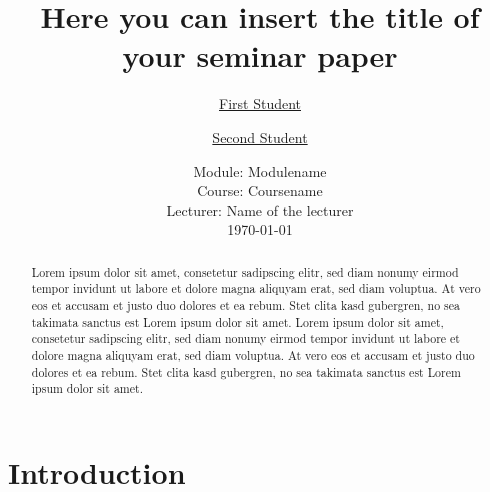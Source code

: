 \documentclass[a4paper]{article}
\begin{document}
	\title{
	\vspace{1cm}
	\Huge Here you can insert the title of \\ your seminar paper \\
	}
	
	\vspace{1cm}
	
	
	\author{\Large \href{mailto:first.student@smail.fh-koeln.de}{First Student} \and \Large \href{mailto:second.student@smail.fh-koeln.de}{Second Student}
	\vspace{1cm}}
	
	\date{
	\large Module: Modulename \\ Course: Coursename \\ 
	\vspace{0.8cm}
	\large Lecturer: Name of the lecturer \\
	\vspace{1cm}
	\today
	}

	\maketitle
	\setlength{\parindent}{0pt}

\vspace{2cm}
\begin{abstract}
Lorem ipsum dolor sit amet, consetetur sadipscing elitr, sed diam nonumy eirmod tempor invidunt ut labore et dolore magna aliquyam erat, sed diam voluptua. At vero eos et accusam et justo duo dolores et ea rebum. Stet clita kasd gubergren, no sea takimata sanctus est Lorem ipsum dolor sit amet. Lorem ipsum dolor sit amet, consetetur sadipscing elitr, sed diam nonumy eirmod tempor invidunt ut labore et dolore magna aliquyam erat, sed diam voluptua. At vero eos et accusam et justo duo dolores et ea rebum. Stet clita kasd gubergren, no sea takimata sanctus est Lorem ipsum dolor sit amet.

\end{abstract}
	\newpage
	\tableofcontents
	\newpage
	
\section{Introduction} %
\label{sec:introduction}
\end{document}
